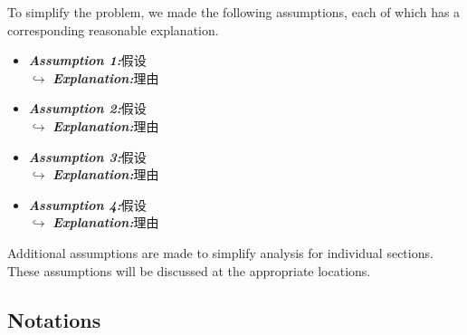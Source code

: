 \documentclass[12pt]{ctexart}
\begin{document}
To simplify the problem, we made the following assumptions, each of which has a corresponding reasonable explanation.
\begin{itemize}
	\item \textit{\textbf{Assumption 1:}}假设\\$\hookrightarrow$ \textit{\textbf{Explanation:}}理由

	\item \textit{\textbf{Assumption 2:}}假设\\$\hookrightarrow$ \textit{\textbf{Explanation:}}理由

	\item \textit{\textbf{Assumption 3:}}假设\\$\hookrightarrow$ \textit{\textbf{Explanation:}}理由

	\item \textit{\textbf{Assumption 4:}}假设\\$\hookrightarrow$ \textit{\textbf{Explanation:}}理由
\end{itemize}
Additional assumptions are made to simplify analysis for individual sections. These assumptions will be discussed at the appropriate locations.

\newpage
\subsection{Notations}%
\end{document}
